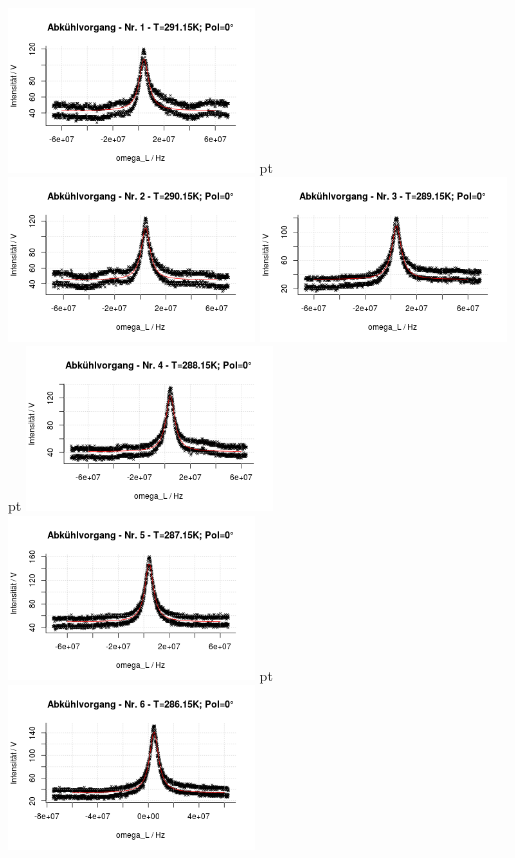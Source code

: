 \documentclass[12pt]{article}
\begin{document}
\begin{minipage}[h!]{\textwidth}
	\centering
	\includegraphics[width=0.49\textwidth]{figures/cold0-1.png} pt
	\includegraphics[width=0.49\textwidth]{figures/cold0-2.png}\vskip -10pt
	\includegraphics[width=0.49\textwidth]{figures/cold0-3.png} pt
	\includegraphics[width=0.49\textwidth]{figures/cold0-4.png}\vskip -10pt
	\includegraphics[width=0.49\textwidth]{figures/cold0-5.png} pt
	\includegraphics[width=0.49\textwidth]{figures/cold0-6.png}\vskip -10pt

\end{minipage}\newpage
\end{document}
